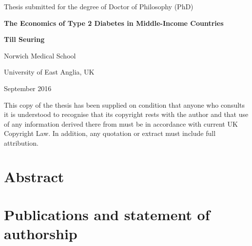 


%
\date{\today}
\makeatletter
\begin{titlepage}
\centering
\vfill
Thesis submitted for the degree of Doctor of Philosophy (PhD)
\par
\vspace*{1in}
\begin{Large}\bfseries
The Economics of Type 2 Diabetes in Middle-Income Countries\par
\end{Large}
\vspace{1in}
\begin{large}\bfseries
Till Seuring\par
\end{large}
\par
\vspace{0.2in}
Norwich Medical School
\par
University of East Anglia, UK
\par
\vspace{1.0in}
September 2016
\par
\vspace{2.0in}
This copy of the thesis has been supplied on condition that anyone who consults it is
understood to recognise that its copyright rests with the author and that use of any
information derived there from must be in accordance with current UK Copyright Law.
In addition, any quotation or extract must include full attribution.
\end{titlepage}
\makeatother

\cleardoublepage
{}
\chapter*{\label{abstract}Abstract}


\tableofcontents

\cleardoublepage
{}
\listoffigures

\cleardoublepage
{} 
\listoftables
\cleardoublepage

\chapter*{\label{publication_statement}Publications and statement of authorship}


